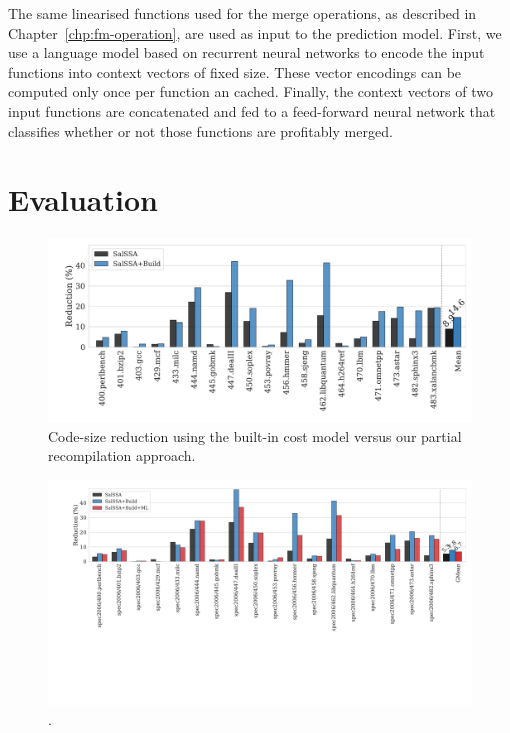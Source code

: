 The same linearised functions used for the merge operations, as described in Chapter~\ref{chp:fm-operation}, are used as input to the prediction model.
First, we use a language model based on recurrent neural networks to encode the input functions into context vectors of fixed size.
These vector encodings can be computed only once per function an cached.
Finally, the context vectors of two input functions are concatenated and fed to a feed-forward neural network that classifies whether or not those functions are profitably merged.

\section{Evaluation}

\begin{figure}[h]
  \centering
  \includegraphics[width=\textwidth]{src/deeplearning/figs/code-size-partial-oracle-v1.pdf}
  \caption{Code-size reduction using the built-in cost model versus our partial recompilation approach.}
  \label{fig:code-size-partial-oracle}
\end{figure}



\begin{figure}[h]
  \centering
  \includegraphics[width=\textwidth]{src/deeplearning/figs/code-size-prediction.pdf}
  \caption{.}
  \label{fig:code-size-with-prediction}
\end{figure}